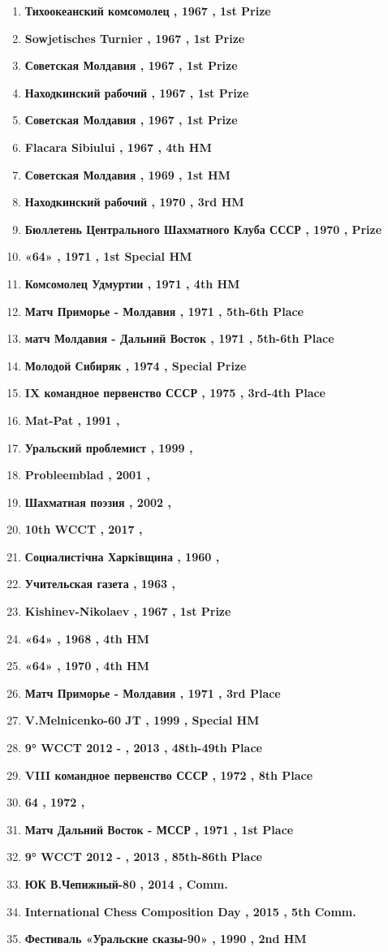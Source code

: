 \begin{enumerate}
\item  \textbf{ Тихоокеанский комсомолец , 1967 , 1st Prize }
\item  \textbf{ Sowjetisches Turnier , 1967 , 1st Prize }
\item  \textbf{ Советская Молдавия , 1967 , 1st Prize }
\item  \textbf{ Находкинский рабочий , 1967 , 1st Prize }
\item  \textbf{ Советская Молдавия , 1967 , 1st Prize }
\item  \textbf{ Flacara Sibiului , 1967 , 4th HM }
\item  \textbf{ Советская Молдавия , 1969 , 1st HM }
\item  \textbf{ Находкинский рабочий , 1970 , 3rd HM }
\item  \textbf{ Бюллетень Центрального Шахматного Клуба СССР , 1970 , Prize }
\item  \textbf{ «64» , 1971 , 1st Special HM }
\item  \textbf{ Комсомолец Удмуртии , 1971 , 4th HM }
\item  \textbf{ Матч Приморье - Молдавия , 1971 , 5th-6th Place }
\item  \textbf{ матч Молдавия - Дальний Восток , 1971 , 5th-6th Place }
\item  \textbf{ Молодой Сибиряк , 1974 , Special Prize }
\item  \textbf{ IX командное первенство СССР , 1975 , 3rd-4th Place }
\item  \textbf{ Mat-Pat , 1991 , }
\item  \textbf{ Уральский проблемист , 1999 , }
\item  \textbf{ Probleemblad , 2001 , }
\item  \textbf{ Шахматная поэзия , 2002 , }
\item  \textbf{ 10th WCCT , 2017 , }
\item  \textbf{ Социалистiчна Харкiвщина , 1960 , }
\item  \textbf{ Учительская газета , 1963 , }
\item  \textbf{ Kishinev-Nikolaev , 1967 , 1st Prize }
\item  \textbf{ «64» , 1968 , 4th HM }
\item  \textbf{ «64» , 1970 , 4th HM }
\item  \textbf{ Матч Приморье  - Молдавия , 1971 , 3rd Place }
\item  \textbf{ V.Melnicenko-60 JT , 1999 , Special HM }
\item  \textbf{ 9° WCCT 2012 - , 2013 , 48th-49th Place }
\item  \textbf{ VIII командное первенство СССР , 1972 , 8th Place }
\item  \textbf{ 64 , 1972 , }
\item  \textbf{ Матч Дальний Восток - МССР , 1971 , 1st Place }
\item  \textbf{ 9° WCCT 2012 - , 2013 , 85th-86th Place }
\item  \textbf{ ЮК В.Чепижный-80 , 2014 , Comm. }
\item  \textbf{ International Chess Composition Day , 2015 , 5th Comm. }
\item  \textbf{ Фестиваль «Уральские сказы-90» , 1990 , 2nd HM }

\end{enumerate}